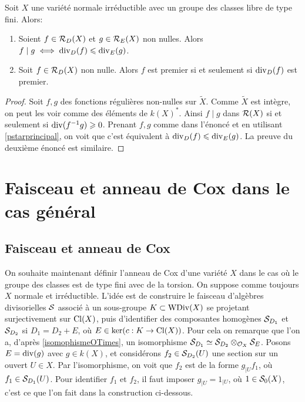 \begin{prop}\label{divisibilitePropsFreeCox}
Soit $X$ une variété normale irréductible avec un groupe des classes libre de type fini.  Alors:
\begin{enumerate}
\item Soient $f\in \mathcal{R}_D(X)$ et $g\in \mathcal{R}_E(X)$ non nulles. Alors $f\mid g\iff \operatorname{div}_D(f)\leqslant\operatorname{div}_E(g)$.
\item Soit $f\in \mathcal{R}_D(X)$ non nulle. Alors $f$ est premier si et seulement si $\operatorname{div}_D(f)$ est premier.
\end{enumerate}
\end{prop}
\begin{proof}
Soit $f,g$ des fonctions régulières non-nulles sur $\widetilde{X}$. Comme $\widetilde{X}$ est intègre, on peut les voir comme des éléments de $k(X)^*$. Ainsi $f\mid g$ dans $\mathcal{R}(X)$ si et seulement si $\operatorname{div}(f^{-1}g)\geqslant 0$. Prenant $f,g$ comme dans l'énoncé et en utilisant \ref{pstarprincipal}, on voit que c'est équivalent à $\operatorname{div}_D(f)\leqslant\operatorname{div}_E(g)$. La preuve du deuxième énoncé est similaire.
\end{proof}

\section{Faisceau et anneau de Cox dans le cas général}

\subsection{Faisceau et anneau de Cox}

On souhaite maintenant définir l'anneau de Cox d'une variété $X$ dans le cas où le groupe des classes est de type fini avec de la torsion. On suppose comme toujours $X$
normale et irréductible. L'idée est de construire le faisceau d'algèbres divisorielles $\mathcal{S}$ associé à un sous-groupe $K\subset \operatorname{WDiv}(X)$ se projetant surjectivement sur $\operatorname{Cl}(X)$, puis d'identifier des composantes homogènes $\mathcal{S}_{D_1}$ et  $\mathcal{S}_{D_2}$ si $D_1=D_2+E$, où $E\in \ker (c:K\rightarrow \operatorname{Cl}(X))$. Pour cela on remarque que l'on a, d'après \ref{isomophismeOTimes}, un isomorphisme $\mathcal{S}_{D_1}\simeq \mathcal{S}_{D_2}\otimes_{\mathcal{O}_X}\mathcal{S}_E$. Posons $E=\operatorname{div}(g)$ avec $g\in k(X)$, et considérons $f_2\in \mathcal{S}_{D_2}(U)$ une section sur un ouvert $U\in X$. Par l'isomorphisme, on voit que $f_2$ est de la forme $g_{|U}f_1$, où $f_1\in \mathcal{S}_{D_1}(U)$. Pour identifier $f_1$ et $f_2$, il faut imposer $g_{|U}=1_{|U}$, où $1\in\mathcal{S}_0(X)$, c'est ce que l'on fait dans la construction ci-dessous.

